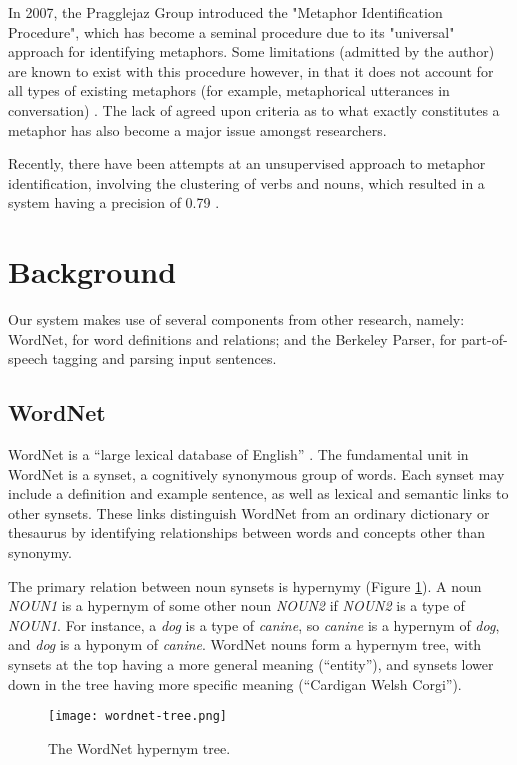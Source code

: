 \documentclass[12pt]{article}
\begin{document}
In 2007, the Pragglejaz Group introduced the "Metaphor Identification Procedure", which has become a seminal procedure due to its "universal" approach for identifying metaphors. Some limitations (admitted by the author) are known to exist with this procedure however, in that it does not account for all types of existing metaphors (for example, metaphorical utterances in conversation) \cite{pragglejaz}. The lack of agreed upon criteria as to what exactly constitutes a metaphor has also become a major issue amongst researchers.

Recently, there have been attempts at an unsupervised approach to metaphor identification, involving the clustering of verbs and nouns, which resulted in a system having a precision of 0.79 \cite{shutova101}.

\section{Background}

Our system makes use of several components from other research, namely: WordNet, for word definitions and relations; and the Berkeley Parser, for part-of-speech tagging and parsing input sentences.

\subsection{WordNet}

WordNet is a ``large lexical database of English'' \cite{wordnet}. The fundamental unit in WordNet is a synset, a cognitively synonymous group of words. Each synset may include a definition and example sentence, as well as lexical and semantic links to other synsets. These links distinguish WordNet from an ordinary dictionary or thesaurus by identifying relationships between words and concepts other than synonymy.

The primary relation between noun synsets is hypernymy (Figure \ref{fig:wordnettree}). A noun \emph{NOUN1} is a hypernym of some other noun \emph{NOUN2} if \emph{NOUN2} is a type of \emph{NOUN1}. For instance, a \emph{dog} is a type of \emph{canine}, so \emph{canine} is a hypernym of \emph{dog}, and \emph{dog} is a hyponym of \emph{canine}. WordNet nouns form a hypernym tree, with synsets at the top having a more general meaning (``entity''), and synsets lower down in the tree having more specific meaning (``Cardigan Welsh Corgi'').

\begin{figure}[h]
	\centering
	\texttt{[image: wordnet-tree.png]}
	\caption{The WordNet hypernym tree.}
	\label{fig:wordnettree}
\end{figure}
\end{document}
